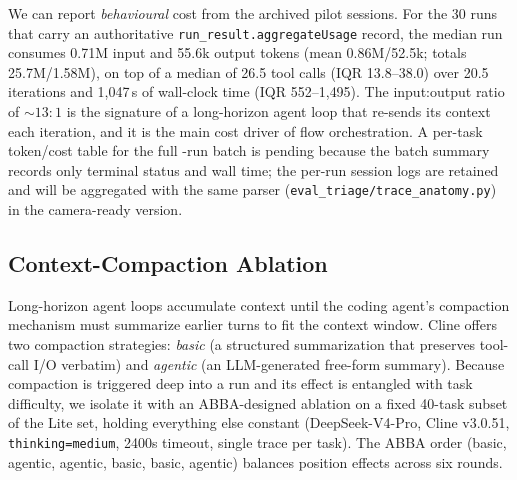 We can report \emph{behavioural} cost from the archived pilot sessions. For the 30
runs that carry an authoritative \texttt{run\_result.aggregateUsage} record, the
median run consumes 0.71M input and 55.6k output tokens (mean 0.86M/52.5k; totals
25.7M/1.58M), on top of a median of 26.5 tool calls (IQR 13.8--38.0) over 20.5
iterations and 1{,}047\,s of wall-clock time (IQR 552--1{,}495). The input:output
ratio of ${\sim}13{:}1$ is the signature of a long-horizon agent loop that re-sends
its context each iteration, and it is the main cost driver of flow orchestration.
A per-task token/cost table for the full \Neval{}-run batch is pending because the
batch summary records only terminal status and wall time; the per-run session logs
are retained and will be aggregated with the same parser
(\texttt{eval\_triage/trace\_anatomy.py}) in the camera-ready version.

\subsection{Context-Compaction Ablation}
\label{sec:compaction-ablation}

Long-horizon agent loops accumulate context until the coding agent's compaction
mechanism must summarize earlier turns to fit the context window. Cline offers
two compaction strategies: \emph{basic} (a structured summarization that
preserves tool-call I/O verbatim) and \emph{agentic} (an LLM-generated free-form
summary). Because compaction is triggered deep into a run and its effect is
entangled with task difficulty, we isolate it with an ABBA-designed ablation on
a fixed 40-task subset of the Lite set, holding everything else constant
(DeepSeek-V4-Pro, Cline v3.0.51, \texttt{thinking=medium}, 2400s timeout, single
trace per task). The ABBA order (basic, agentic, agentic, basic, basic, agentic)
balances position effects across six rounds.


